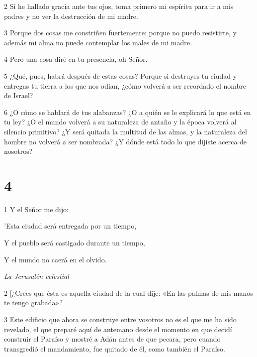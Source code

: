 \par 2 Si he hallado gracia ante tus ojos, toma primero mi espíritu para ir a mis padres y no ver la destrucción de mi madre.

\par 3 Porque dos cosas me constriñen fuertemente: porque no puedo resistirte, y además mi alma no puede contemplar los males de mi madre.

\par 4 Pero una cosa diré en tu presencia, oh Señor.

\par 5 ¿Qué, pues, habrá después de estas cosas? Porque si destruyes tu ciudad y entregas tu tierra a los que nos odian, ¿cómo volverá a ser recordado el nombre de Israel?

\par 6 ¿O cómo se hablará de tus alabanzas? ¿O a quién se le explicará lo que está en tu ley? ¿O el mundo volverá a su naturaleza de antaño y la época volverá al silencio primitivo? ¿Y será quitada la multitud de las almas, y la naturaleza del hombre no volverá a ser nombrada? ¿Y dónde está todo lo que dijiste acerca de nosotros?

\chapter{4}

\par 1 Y el Señor me dijo:

\par 'Esta ciudad será entregada por un tiempo,

\par Y el pueblo será castigado durante un tiempo,

\par Y el mundo no caerá en el olvido.

\par \textit{La Jerusalén celestial}

\par 2 [¿Crees que ésta es aquella ciudad de la cual dije: «En las palmas de mis manos te tengo grabada»?

\par 3 Este edificio que ahora se construye entre vosotros no es el que me ha sido revelado, el que preparé aquí de antemano desde el momento en que decidí construir el Paraíso y mostré a Adán antes de que pecara, pero cuando transgredió el mandamiento, fue quitado de él, como también el Paraíso.

